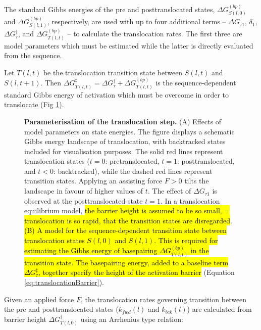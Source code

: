 \documentclass[10pt,letterpaper]{article}
\begin{document}
The standard Gibbs energies of the pre and posttranslocated states, $\Delta G^{(bp)}_{S(l,0)}$  and  $\Delta G^{(bp)}_{S(l,1)}$, respectively, are used with up to four additional terms -- $\Delta G_{\tau 1}$, $\delta_1$, $\Delta G^\ddag_{\tau}$, and $\Delta G_{T(l,t)}^{(bp)}$ --  to calculate the translocation rates. The first three are model parameters which must be estimated while the latter is directly evaluated from the sequence.



Let $T(l,t)$ be the translocation transition state between $S(l,t)$ and $S(l,t+1)$. Then $\Delta G_{T(l,t)}^{\ddag} = \Delta G^\ddag_{\tau} + \Delta G_{T(l,t)}^{(bp)}$ is the sequence-dependent standard Gibbs energy of activation which must be overcome in order to translocate (Fig \ref{fig3}).


\begin{figure}[!h]
\caption{\textbf{Parameterisation of the translocation step.}
(A) Effects of model parameters on state energies. The figure displays a schematic Gibbs energy landscape of translocation, with backtracked states included for visualisation purposes. The solid red lines represent translocation states ($t=0$: pretranslocated, $t=1$: posttranslocated, and $t<0$: backtracked), while the dashed red lines represent transition states. Applying an assisting force $F>0$ tilts the landscape in favour of higher values of $t$. The effect of $\Delta G_{\tau 1}$ is observed at the posttranslocated state $t=1$. In a translocation equilibrium model, \hl{the barrier height is assumed to be so small, = translocation is so rapid, that the transition states are disregarded}.  \hl{(B) A model for the sequence-dependent transition state between translocation states $S(l,  0)$ and $S(l,  1)$. This is required for estimating the Gibbs energy of basepairing $\Delta G_{T(l,t)}^{(bp)}$ in the transition state. The basepairing energy, added to a baseline term $\Delta G^\ddag_{\tau}$, together specify the height of the activation barrier  } (Equation \ref{eq:translocationBarrier}). }
\label{fig3}
\end{figure}





Given an applied force $F$, the translocation rates governing transition between the pre and posttranslocated states ($k_{fwd}(l)$ and $k_{bck}(l)$) are calculated from barrier height $\Delta G_{T(l,0)}^{\ddag}$ using an Arrhenius type relation:
\end{document}
